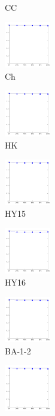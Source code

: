 \documentclass[a4paper,10pt]{article}
\begin{document}
\begin{figure}[ht]
{\begin{subfigure}[b]{2.5cm}
\caption{CC}
\end{subfigure} 
\begin{subfigure}[b]{2.5cm}
\centering
\includegraphics[height=2cm]{allcat_Ch.pdf}
\caption{Ch}
\end{subfigure} 
\begin{subfigure}[b]{2.5cm}
\centering
\includegraphics[height=2cm]{allcat_HK.pdf}
\caption{HK}
\end{subfigure} 
\begin{subfigure}[b]{2.5cm}
\centering
\includegraphics[height=2cm]{allcat_HY15.pdf}
\caption{HY15}
\end{subfigure} 
\begin{subfigure}[b]{2.5cm}
\centering
\includegraphics[height=2cm]{allcat_HY16.pdf}
\caption{HY16}
\end{subfigure} 
\begin{subfigure}[b]{2.5cm}
\centering
\includegraphics[height=2cm]{allcat_BA-1-2.pdf}
\caption{BA-1-2}
\end{subfigure} 
\begin{subfigure}[b]{2.5cm}
\centering
\includegraphics[height=2cm]{allcat_BA-2-4.pdf}

\end{subfigure}}
\end{figure}
\end{document}
